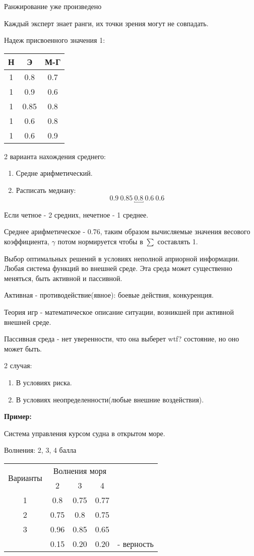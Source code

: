 \documentclass[12pt,a5paper]{scrbook}
\begin{document}
  Ранжирование уже произведено

  Каждый эксперт знает ранги, их точки зрения могут не совпадать.

  Надеж присвоенного значения 1:

  \begin{tabular}{c|c|c}
    Н & Э & М-Г\\
    \hline
    1 & 0.8 & 0.7\\
    1 & 0.9 & 0.6\\
    1 & 0.85 & 0.8\\
    1 & 0.6 & 0.8\\
    1 & 0.6 & 0.9
  \end{tabular}

  2 варианта нахождения среднего:
  \begin{enumerate}
    \item Средне арифметический.
    \item Расписать медиану:$$0.9 \ 0.85 \ \underbracket{0.8} \ 0.6 \ 0.6$$
  \end{enumerate}

  Если четное - 2 средних, нечетное - 1 среднее.

  Среднее арифметическое - 0.76, таким образом вычисляемые значения весового коэффициента, $\gamma$ потом нормируется чтобы в $\sum$ составлять 1.

  Выбор оптимальных решений в условиях неполной априорной информации. Любая система функций во внешней среде. Эта среда может существенно меняться, быть активной и пассивной.

  Активная - противодействие(явное): боевые действия, конкуренция.

  Теория игр - математическое описание ситуации, возникшей при активной внешней среде.

  Пассивная среда - нет уверенности, что она выберет wtf? состояние, но оно может быть.

  2 случая:
  \begin{enumerate}
    \item В условиях риска.
    \item В условиях неопределенности(любые внешние воздействия).
  \end{enumerate}

  \textbf{Пример:}

  Система управления курсом судна в открытом море.

  Волнения: 2, 3, 4 балла

  \begin{tabular}{c|c|c|cl}
    \cline{1-4}
    \multirow{2}{*}{Варианты} & \multicolumn{3}{c}{Волнения моря}&\\
    \cline{2-4}
    & 2 & 3 & 4&\\
    \cline{1-4}
    1 & 0.8 & 0.75 & 0.77&\\
    \cline{1-4}
    2 & 0.75 & 0.8 & 0.75&\\
    \cline{1-4}
    3 & 0.96 & 0.85 & 0.65&\\
    \cline{1-4}
    & 0.15 & 0.20 & 0.20 & - верность
  \end{tabular}
\end{document}
